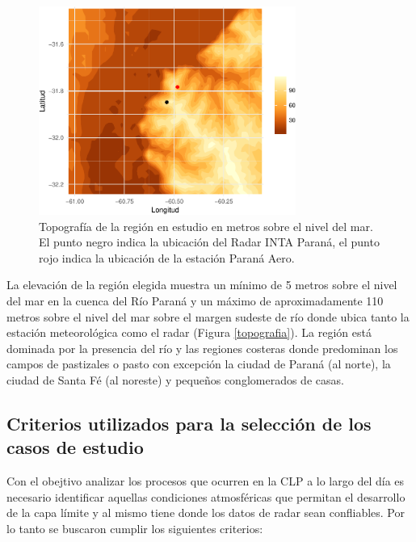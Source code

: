 \documentclass[12pt,spanish,oneside]{book}
\begin{document}
\begin{figure}

{\centering \includegraphics[width=0.75\textwidth]{Tesis_files/figure-latex/topografia-1} 

}

\caption[Topografía de la región en estudio en metros sobre el nivel del mar.]{Topografía de la región en estudio en metros sobre el nivel del mar. El punto negro indica la ubicación del Radar INTA Paraná, el punto rojo indica la ubicación de la estación Paraná Aero. \label{topografia}}\label{fig:topografia}
\end{figure}

La elevación de la región elegida muestra un mínimo de 5 metros sobre el
nivel del mar en la cuenca del Río Paraná y un máximo de aproximadamente
110 metros sobre el nivel del mar sobre el margen sudeste de río donde
ubica tanto la estación meteorológica como el radar (Figura
\ref{topografia}). La región está dominada por la presencia del río y
las regiones costeras donde predominan los campos de pastizales o pasto
con excepción la ciudad de Paraná (al norte), la ciudad de Santa Fé (al
noreste) y pequeños conglomerados de casas.

\subsection{Criterios utilizados para la selección de los casos de
estudio}\label{criterios-utilizados-para-la-seleccion-de-los-casos-de-estudio}

Con el obejtivo analizar los procesos que ocurren en la CLP a lo largo
del día es necesario identificar aquellas condiciones atmosféricas que
permitan el desarrollo de la capa límite y al mismo tiene donde los
datos de radar sean confliables. Por lo tanto se buscaron cumplir los
siguientes criterios:
\end{document}
